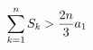 \documentclass[preview]{standalone}
\begin{document}
\begin{align*}
\special{dvisvgm:raw <g id='unique000'>}\sum_{k=1}^{n}S_k>\frac{2n}{3}a_1\special{dvisvgm:raw </g>}
\end{align*}
\end{document}

